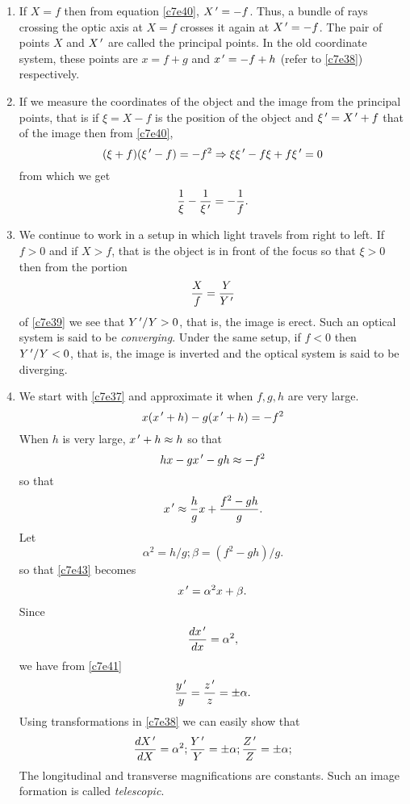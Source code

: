 \begin{enumerate}
\item If $X = f$ then from equation \eqref{c7e40}, $X^{\,\prime} = -f$. Thus, a bundle
of rays crossing the optic axis at $X = f$ crosses it again at $X^{\,\prime} = -f$.
The pair of points $X$ and $X^{\,\prime}$ are called the principal points. In the
old coordinate system, these points are $x = f + g$ and $x^{\,\prime} = -f + h$ (refer
to \eqref{c7e38}) respectively.

\item If we measure the coordinates of the object and the image from the
principal points, that is if $\xi = X - f$ is the position of the object and
$\xi^{\,\prime} = X^{\,\prime} + f$ that of the image then from \eqref{c7e40},
\[
(\xi + f)(\xi^{\,\prime} - f) = -f^2 \Rightarrow \xi\xi^{\,\prime} - f\xi + f\xi^{\,\prime} = 0
\]
from which we get
\begin{equation}\label{c7e42}
\frac{1}{\xi} - \frac{1}{\xi^{\,\prime}} = -\frac{1}{f}.
\end{equation}

\item We continue to work in a setup in which light travels from right to left.
If $f > 0$ and if $X > f$, that is the object is in front of the focus so that
$\xi > 0$ then from the portion
\[
\frac{X}{f} = \frac{Y}{Y^{\,\prime}}
\]
of \eqref{c7e39} we see that $Y^{\,\prime}/Y > 0$, that is, the image is erect. Such
an optical system is said to be \emph{converging}. Under the same setup, if
$f < 0$ then $Y^{\,\prime}/Y < 0$, that is, the image is inverted and the optical 
system is said to be diverging.

\item We start with \eqref{c7e37} and approximate it when $f, g, h$ are very 
large.
\[
x(x^{\,\prime} +h) - g(x^{\,\prime} + h) = -f^2
\]
When $h$ is very large, $x^{\,\prime} + h \approx h$ so that
\[
hx - gx^{\,\prime} - gh \approx -f^2
\]
so that
\begin{equation}\label{c7e43}
x^{\,\prime} \approx \frac{h}{g}x + \frac{f^2 - gh}{g}.
\end{equation}
Let
\begin{equation}\label{c7e44}
\alpha^2 = h/g; \beta = (f^2 - gh)/g.
\end{equation}
so that \eqref{c7e43} becomes
\begin{equation}\label{c7e45}
x^{\,\prime} = \alpha^2x + \beta.
\end{equation}
Since
\[
\frac{d{x^{\,\prime}}}{d{x}} = \alpha^2,
\]
we have from \eqref{c7e41}
\[
\frac{y^{\,\prime}}{y} = \frac{z^{\,\prime}}{z} = \pm\alpha.
\]
Using transformations in \eqref{c7e38} we can easily show that
\begin{equation}\label{c7e46}
\frac{d{X^{\,\prime}}}{d{X}} = \alpha^2; \frac{Y^{\,\prime}}{Y}=\pm\alpha;\frac{Z^{\,\prime}}{Z}=\pm\alpha;
\end{equation}
The longitudinal and transverse magnifications are constants. Such an image
formation is called \emph{telescopic}.


\end{enumerate}
